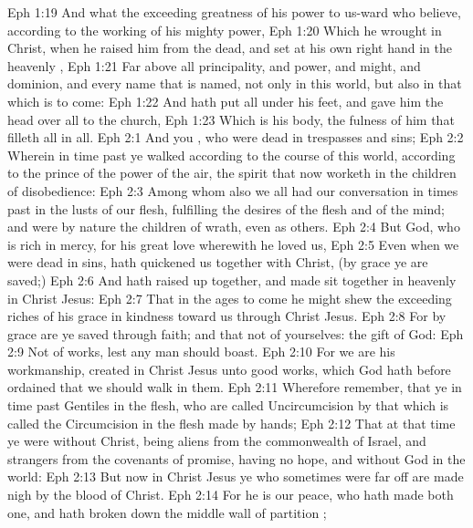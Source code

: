 \vs Eph 1:19 And what  the exceeding greatness of his power to us-ward who believe, according to the working of his mighty power,
\vs Eph 1:20 Which he wrought in Christ, when he raised him from the dead, and set  at his own right hand in the heavenly ,
\vs Eph 1:21 Far above all principality, and power, and might, and dominion, and every name that is named, not only in this world, but also in that which is to come:
\vs Eph 1:22 And hath put all  under his feet, and gave him  the head over all  to the church,
\vs Eph 1:23 Which is his body, the fulness of him that filleth all in all.
\vs Eph 2:1 And you , who were dead in trespasses and sins;
\vs Eph 2:2 Wherein in time past ye walked according to the course of this world, according to the prince of the power of the air, the spirit that now worketh in the children of disobedience:
\vs Eph 2:3 Among whom also we all had our conversation in times past in the lusts of our flesh, fulfilling the desires of the flesh and of the mind; and were by nature the children of wrath, even as others.
\vs Eph 2:4 But God, who is rich in mercy, for his great love wherewith he loved us,
\vs Eph 2:5 Even when we were dead in sins, hath quickened us together with Christ, (by grace ye are saved;)
\vs Eph 2:6 And hath raised  up together, and made  sit together in heavenly  in Christ Jesus:
\vs Eph 2:7 That in the ages to come he might shew the exceeding riches of his grace in  kindness toward us through Christ Jesus.
\vs Eph 2:8 For by grace are ye saved through faith; and that not of yourselves:  the gift of God:
\vs Eph 2:9 Not of works, lest any man should boast.
\vs Eph 2:10 For we are his workmanship, created in Christ Jesus unto good works, which God hath before ordained that we should walk in them.
\vs Eph 2:11 Wherefore remember, that ye  in time past Gentiles in the flesh, who are called Uncircumcision by that which is called the Circumcision in the flesh made by hands;
\vs Eph 2:12 That at that time ye were without Christ, being aliens from the commonwealth of Israel, and strangers from the covenants of promise, having no hope, and without God in the world:
\vs Eph 2:13 But now in Christ Jesus ye who sometimes were far off are made nigh by the blood of Christ.
\vs Eph 2:14 For he is our peace, who hath made both one, and hath broken down the middle wall of partition ;
